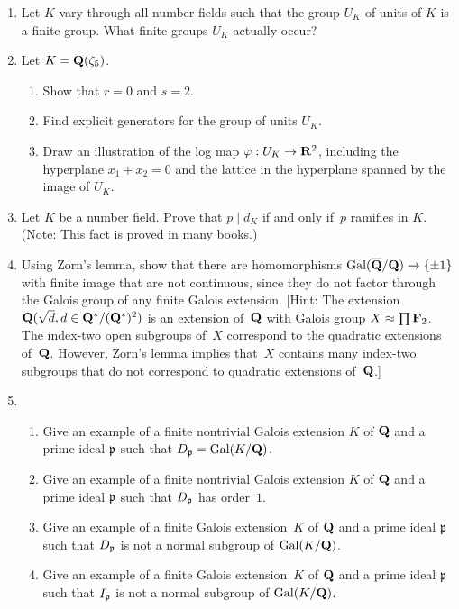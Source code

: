 \begin{enumerate}
\item Let $K$ vary through all number fields such that the
group $U_K$ of units of $K$ is a finite group.  What finite groups
$U_K$ actually occur?

\item Let $K=\mathbf{Q}(\zeta_5)$.
\begin{enumerate}
\item Show that $r=0$ and $s=2$.
\item Find explicit generators for the group of
units $U_K$.
\item Draw an illustration of the log map
$\varphi:U_K\to \mathbf{R}^2$, including the hyperplane
$x_1+x_2=0$ and the lattice in the hyperplane 
spanned by the image of $U_K$.
\end{enumerate}






\item Let $K$ be a number field.  Prove that $p\mid d_K$ if and only
  if~$p$ ramifies in $K$.  (Note: This fact is proved in many
  books.)

\item Using Zorn's lemma, show that there are homomorphisms
  $\operatorname{Gal}(\overline{\mathbf{Q}}/\mathbf{Q})\to\{\pm 1\}$ with finite image that are not continuous, since
  they do not factor through the Galois group of any finite Galois
  extension.  [Hint: The extension $\mathbf{Q}(\sqrt{d}, d \in \mathbf{Q}^*/(\mathbf{Q}^*)^2)$
  is an extension of~$\mathbf{Q}$ with Galois group $X\approx \prod \mathbf{F}_2$.
  The index-two open subgroups of~$X$ correspond to the quadratic
  extensions of~$\mathbf{Q}$. However, Zorn's lemma implies that~$X$ contains
  many index-two subgroups that do not correspond to quadratic
  extensions of~$\mathbf{Q}$.]

\item 
\begin{enumerate}
\item Give an example of a finite nontrivial Galois extension $K$ of $\mathbf{Q}$
and a prime ideal $\mathfrak{p}$ such that $D_{\mathfrak{p}} = \operatorname{Gal}(K/\mathbf{Q})$.
\item Give an example of a finite nontrivial Galois extension $K$ of
  $\mathbf{Q}$ and a prime ideal $\mathfrak{p}$ such that $D_{\mathfrak{p}}$ has order~$1$.
\item Give an example of a finite Galois extension~$K$ of
  $\mathbf{Q}$ and a prime ideal $\mathfrak{p}$ such that $D_{\mathfrak{p}}$ is not a normal
  subgroup of $\operatorname{Gal}(K/\mathbf{Q})$.
\item Give an example of a finite Galois extension~$K$ of
  $\mathbf{Q}$ and a prime ideal $\mathfrak{p}$ such that $I_{\mathfrak{p}}$ is not a normal
  subgroup of $\operatorname{Gal}(K/\mathbf{Q})$.
\end{enumerate}


\end{enumerate}
